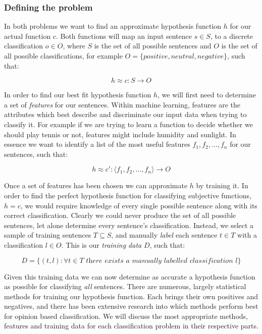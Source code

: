 \subsubsection{Defining the problem}

In both problems we want to find an approximate hypothesis function $h$ for our actual function $c$. Both functions will map an input sentence $s\in S$, to a discrete classification $o\in O$, where $S$ is the set of all possible sentences and $O$ is the set of all possible classifications, for example $O=\{positive, neutral, negative\}$, such that:

\begin{equation}
	h \approx c:S \rightarrow O
\end{equation}

In order to find our best fit hypothesis function $h$, we will first need to determine a set of \emph{features} for our sentences. Within machine learning, features are the attributes which best describe and discriminate our input data when trying to classify it. For example if we are trying to learn a function to decide whether we should play tennis or not, features might include humidity and sunlight. In essence we want to identify a list of the most useful features $f_1, f_2,\dots,f_n$ for our sentences, such that:
	
\begin{equation}
	h \approx c' : \langle f_1, f_2,\dots,f_n \rangle \rightarrow O
\end{equation}

Once a set of features has been chosen we can approximate $h$ by training it. In order to find the perfect hypothesis function for classifying subjective functions, $h=c$, we would require knowledge of every single possible sentence along with its correct classification. Clearly we could never produce the set of all possible sentences, let alone determine every sentence's classification. Instead, we select a sample of training sentences $T \subseteq S$, and manually \emph{label} each sentence $t \in T$ with a classification $l \in O$. This is our \emph{training data} $D$, such that:

\begin{equation}
	D = \{(t, l) : \forall t \in T \textit{ there exists a manually labelled classification $l$} \}
\end{equation}

Given this training data we can now determine as accurate a hypothesis function as possible for classifying \emph{all} sentences. There are numerous, largely statistical methods for training our hypothesis function. Each brings their own positives and negatives, and there has been extensive research \cite{Pang:2004us} into which methods perform best for opinion based classification. We will discuss the most appropriate methods, features and training data for each classification problem in their respective parts.

